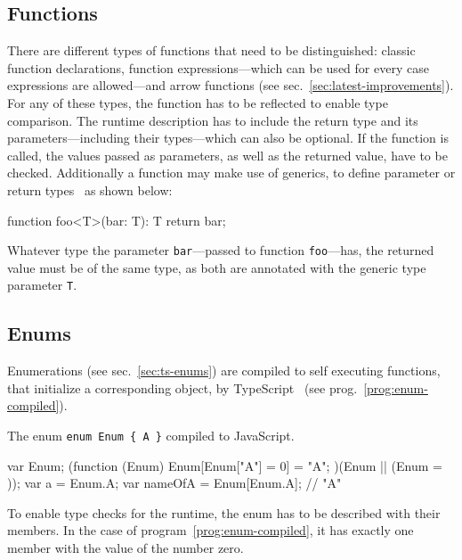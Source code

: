 
\subsection{Functions}

There are different types of functions that need to be distinguished: classic function declarations, function expressions---which can be used for every case expressions are allowed---and arrow functions (see sec.~\ref{sec:latest-improvements}). For any of these types, the function has to be reflected to enable type comparison. The runtime description has to include the return type and its parameters---including their types---which can also be optional. If the function is called, the values passed as parameters, as well as the returned value, have to be checked. Additionally a function may make use of generics, to define parameter or return types~\cite{TypeScriptHandbook:Generics} as shown below:
\begin{JsCode}[numbers=none]
function foo<T>(bar: T): T {
  return bar;
} 
\end{JsCode}
Whatever type the parameter \texttt{bar}---passed to function \texttt{foo}---has, the returned value must be of the same type, as both are annotated with the generic type parameter \texttt{T}.

\subsection{Enums}

Enumerations (see sec.~\ref{sec:ts-enums}) are compiled to self executing functions, that initialize a corresponding object, by TypeScript~\cite{TypeScriptHandbook:Enums} (see prog.~\ref{prog:enum-compiled}).
\begin{program}
\caption{The enum \texttt{enum Enum \{ A \}} compiled to JavaScript.~\cite{TypeScriptHandbook:Enums}}
\label{prog:enum-compiled}
\begin{JsCode}
var Enum;
(function (Enum) {
    Enum[Enum["A"] = 0] = "A";
})(Enum || (Enum = {}));
var a = Enum.A;
var nameOfA = Enum[Enum.A]; // "A"
\end{JsCode}
\end{program}
To enable type checks for the runtime, the enum has to be described with their members. In the case of program~\ref{prog:enum-compiled}, it has exactly one member with the value of the number zero.

